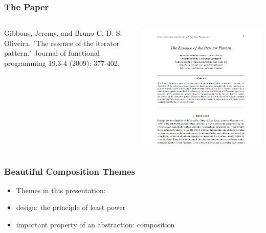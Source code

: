 \documentclass[aspectratio=169]{beamer}
\begin{document}
\begin{frame}[fragile]
  \frametitle{The Paper}
  \begin{columns}
    \begin{column}{0.4\textwidth}
      \begin{center}
        \small
        Gibbons, Jeremy, and Bruno C. D. S. Oliveira. "The essence of
        the iterator pattern." Journal of functional programming 19.3-4
        (2009): 377-402.
      \end{center}

    \end{column}
    \begin{column}{0.7\textwidth}
      \begin{center}
        \includegraphics[height=0.8\textheight, valign=c]{static-images/eip.png}
      \end{center}
    \end{column}
  \end{columns}
\end{frame}

\begin{frame}
  \frametitle{Beautiful Composition \textemdash{} Themes}
  \begin{center}
    {
    }
  \end{center}
  \begin{itemize}
  \item Themes in this presentation:
  \item design: the principle of least power
  \item important property of an abstraction: composition
  \end{itemize}
\end{frame}
\end{document}
